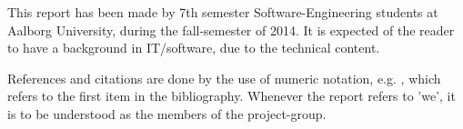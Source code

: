 This report has been made by 7th semester Software-Engineering students at Aalborg University, during the fall-semester of 2014.
It is expected of the reader to have a background in IT/software, due to the technical content.

References and citations are done by the use of numeric notation, e.g. \cite{x}, which refers to the first item in the bibliography.
Whenever the report refers to 'we', it is to be understood as the members of the project-group.